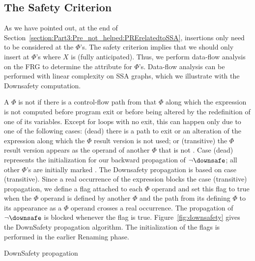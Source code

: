 \subsection{The Safety Criterion}

As we have pointed out, at the end of Section~\ref{section:Part3:Pre_not_helped:PRErelatedtoSSA}, insertions only need to be considered at the $\Phi$'s. 
The safety criterion implies that we should only insert at $\Phi$'s where $X$ is \downsafe (fully anticipated). 
Thus, we perform data-flow analysis on the FRG to determine the \downsafe attribute for $\Phi$'s. 
Data-flow analysis can be performed with linear complexity on SSA graphs, which we illustrate with the Downsafety computation.

A $\Phi$ is not \downsafe{} if there is a control-flow path from that $\Phi$ along which the expression is not computed before program exit or before being altered by the redefinition of one of its variables. 
Except for loops with no exit, this can happen only due to one of the following cases: 
(dead) there is a path to exit or an alteration of the expression along which the $\Phi$ result version is not used; 
or (transitive) the $\Phi$ result version appears as the operand of another $\Phi$ that is not \downsafe. 
Case (dead) represents the initialization for our backward propagation of $\neg \downsafe$; 
all other $\Phi$'s are initially marked \downsafe. 
The Downsafety propagation is based on case (transitive). 
Since a real occurrence of the expression blocks the case (transitive) propagation, we define a \hasrealuse flag attached to each $\Phi$ operand and set this flag to true when the $\Phi$ operand is defined by another $\Phi$ and the path from its defining $\Phi$ to its appearance as a $\Phi$ operand crosses a real occurrence. 
The propagation of $\neg \downsafe$ is blocked whenever the \hasrealuse flag is true. 
Figure~\ref{fig:downsafety} gives the DownSafety propagation algorithm. 
The initialization of the \hasrealuse flags is performed in the earlier Renaming phase.

\begin{algorithm}
  \LinesNumbered
{
}
\vspace{1em}

\caption{DownSafety propagation}
\label{fig:downsafety}
\end{algorithm}

